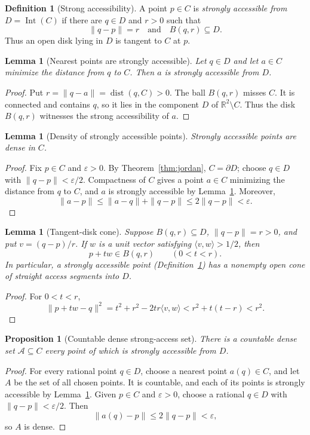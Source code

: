 \documentclass[11pt]{article}
\theoremstyle{mainplain}
\newtheorem{lemma}[theorem]{Lemma}
\newtheorem{proposition}[theorem]{Proposition}
\theoremstyle{mainroman}
\theoremstyle{definition}
\newtheorem{definition}[theorem]{Definition}
\numberwithin{equation}{section}
\begin{document}
\begin{definition}[Strong accessibility]\label{def:strong-accessibility}
A point $p\in C$ is \emph{strongly accessible from}
$D=\operatorname{Int}(C)$ if there are $q\in D$ and $r>0$ such that
\[
\|q-p\|=r
\quad\text{and}\quad
B(q,r)\subseteq D.
\]
Thus an open disk lying in $D$ is tangent to $C$ at $p$.
\end{definition}

\begin{lemma}[Nearest points are strongly accessible]\label{lem:nearest-strong}
Let $q\in D$ and let $a\in C$ minimize the distance from $q$ to $C$.
Then $a$ is strongly accessible from $D$.
\end{lemma}
\begin{proof}
Put $r=\|q-a\|=\operatorname{dist}(q,C)>0$. The ball $B(q,r)$ misses
$C$. It is connected and contains $q$, so it lies in the component $D$
of $\mathbb R^2\setminus C$. Thus the disk $B(q,r)$ witnesses the
strong accessibility of $a$.
\end{proof}

\begin{lemma}[Density of strongly accessible points]\label{lem:tangent-dense}
Strongly accessible points are dense in $C$.
\end{lemma}
\begin{proof}
Fix $p\in C$ and $\varepsilon>0$. By Theorem~\ref{thm:jordan},
$C=\partial D$; choose $q\in D$ with $\|q-p\|<\varepsilon/2$.
Compactness of $C$ gives a point $a\in C$ minimizing the distance from
$q$ to $C$, and $a$ is strongly accessible by
Lemma~\ref{lem:nearest-strong}. Moreover,
\[
\|a-p\|
 \le \|a-q\|+\|q-p\|
 \le 2\|q-p\|
 <\varepsilon.
\]
\end{proof}

\begin{lemma}[Tangent-disk cone]\label{lem:tangent-cone}
Suppose $B(q,r)\subseteq D$, $\|q-p\|=r>0$, and put
$v=(q-p)/r$. If $w$ is a unit vector satisfying
$\langle v,w\rangle>1/2$, then
\[
 p+tw\in B(q,r)
 \qquad(0<t<r).
\]
In particular, a strongly accessible point
(Definition~\ref{def:strong-accessibility}) has a nonempty open cone of
straight access segments into $D$.
\end{lemma}
\begin{proof}
For $0<t<r$,
\[
\|p+tw-q\|^2
 =t^2+r^2-2tr\langle v,w\rangle
 <r^2+t(t-r)
 <r^2.
\]
\end{proof}

\begin{proposition}[Countable dense strong-access set]\label{prop:countable-strong-access}
There is a countable dense set $\mathcal A\subseteq C$ every point of which is
strongly accessible from $D$.
\end{proposition}
\begin{proof}
For every rational point $q\in D$, choose a nearest point
$a(q)\in C$, and let $A$ be the set of all chosen points. It is
countable, and each of its points is strongly accessible by
Lemma~\ref{lem:nearest-strong}. Given $p\in C$ and $\varepsilon>0$, choose a rational
$q\in D$ with $\|q-p\|<\varepsilon/2$. Then
\[
 \|a(q)-p\|\le 2\|q-p\|<\varepsilon,
\]
so $A$ is dense.
\end{proof}
\end{document}
